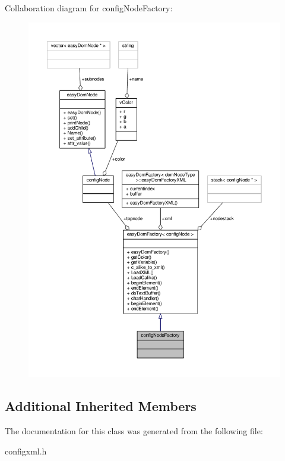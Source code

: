 Collaboration diagram for config\+Node\+Factory\+:
\nopagebreak
\begin{figure}[H]
\begin{center}
\leavevmode
\includegraphics[width=350pt]{dc/d3b/classconfigNodeFactory__coll__graph}
\end{center}
\end{figure}
\subsection*{Additional Inherited Members}


The documentation for this class was generated from the following file\+:\begin{DoxyCompactItemize}
\item 
configxml.\+h\end{DoxyCompactItemize}

